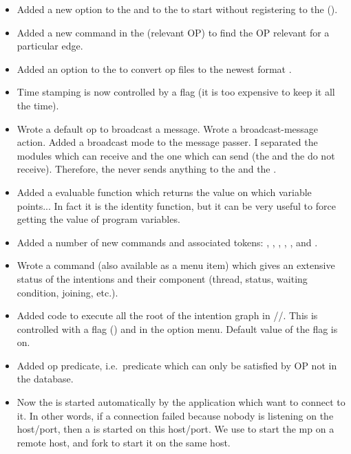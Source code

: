 \begin{itemize}

\item Added a new option to the \CPK{} and to the \XPK{} to start
without registering to the \OPRSS{} ().

\item Added a new command in the \OPE{} (relevant OP) to find the
OP relevant for a particular edge.

\item Added an option to the \OPE{} to convert op files to the
newest format .

\item Time stamping is now controlled by a flag (it is too
expensive to keep it all the time).

\item Wrote a default op to broadcast a message. Wrote a broadcast-message action.
Added a broadcast mode to the message passer. I separated the modules which can
receive and the one which can send (the \OPE{} and the \OPRSS{} do not
receive). Therefore, the \MPA{} never sends anything to the \OPRSS{} and the
\OPE{}.

\item Added a  evaluable function which returns the value on which
variable points... In fact it is the identity function, but it can be very
useful to force getting the value of program variables.

\item Added a number of new commands and associated tokens:
, , , , ,  and .

\item Wrote a  command (also available as a menu item)
which gives an extensive status of the intentions and their component (thread,
status, waiting condition, joining, etc.).

\item Added code to execute all the root of the intention graph in //. This
is controlled with a flag () and in the
option menu. Default value of the flag is on.

\item Added op predicate, i.e.\ predicate which can only be satisfied by
OP not in the database.

\item Now the \MPA{} is started automatically by the application which want to
connect to it. In other words, if a connection failed because nobody is
listening on the host/port, then a \MPA{} is started on this host/port.  We use
 to start the mp on a remote host, and fork to start it on the same host.


\end{itemize}
